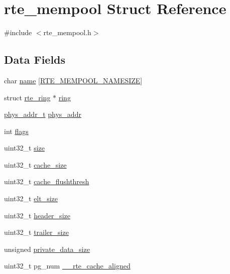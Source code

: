 \hypertarget{structrte__mempool}{}\section{rte\+\_\+mempool Struct Reference}
\label{structrte__mempool}


{\ttfamily \#include $<$rte\+\_\+mempool.\+h$>$}

\subsection*{Data Fields}
\begin{DoxyCompactItemize}
\item 
char \hyperlink{structrte__mempool_aa9d929fcb7038a3fec6da7bae3853aab}{name} \mbox{[}\hyperlink{rte__mempool_8h_af6e5aa92b19f0f8d981b7016264456d7}{R\+T\+E\+\_\+\+M\+E\+M\+P\+O\+O\+L\+\_\+\+N\+A\+M\+E\+S\+I\+Z\+E}\mbox{]}
\item 
struct \hyperlink{structrte__ring}{rte\+\_\+ring} $\ast$ \hyperlink{structrte__mempool_a1dfc25cca5a340eff30700b60fd41339}{ring}
\item 
\hyperlink{rte__memory_8h_aeed7e715f3dcfddef6f34dec94037646}{phys\+\_\+addr\+\_\+t} \hyperlink{structrte__mempool_a3901f538726d14b9ad14e0bd7578c959}{phys\+\_\+addr}
\item 
int \hyperlink{structrte__mempool_ac8bf36fe0577cba66bccda3a6f7e80a4}{flags}
\item 
uint32\+\_\+t \hyperlink{structrte__mempool_ab2c6b258f02add8fdf4cfc7c371dd772}{size}
\item 
uint32\+\_\+t \hyperlink{structrte__mempool_ac0fc8e6a5ca95e81e5d94522c86cfc9c}{cache\+\_\+size}
\item 
uint32\+\_\+t \hyperlink{structrte__mempool_a30ead2c1b80bd7489e6571713424b633}{cache\+\_\+flushthresh}
\item 
uint32\+\_\+t \hyperlink{structrte__mempool_ad61e210d2df01bf9c91230fee6a8cf21}{elt\+\_\+size}
\item 
uint32\+\_\+t \hyperlink{structrte__mempool_a841923a20e6dda97c59351c8e97c9be6}{header\+\_\+size}
\item 
uint32\+\_\+t \hyperlink{structrte__mempool_aa328aea47b0ee3552e4628a4ed5dadac}{trailer\+\_\+size}
\item 
unsigned \hyperlink{structrte__mempool_ae143f874098aaedbee52452a967722d0}{private\+\_\+data\+\_\+size}
\item 
uint32\+\_\+t pg\+\_\+num \hyperlink{structrte__mempool_a5b84b713710582f17581cdbf4278d7a5}{\+\_\+\+\_\+rte\+\_\+cache\+\_\+aligned}

\end{DoxyCompactItemize}
